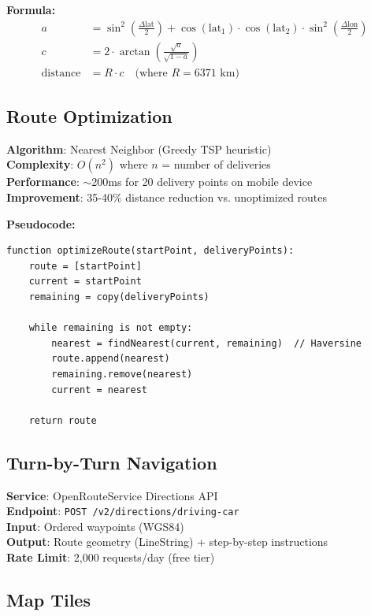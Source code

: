 \documentclass[12pt,a4paper]{article}
\begin{document}
\textbf{Formula:}
\begin{align*}
a &= \sin^2\left(\frac{\Delta\text{lat}}{2}\right) + \cos(\text{lat}_1) \cdot \cos(\text{lat}_2) \cdot \sin^2\left(\frac{\Delta\text{lon}}{2}\right) \\
c &= 2 \cdot \arctan\left(\frac{\sqrt{a}}{\sqrt{1-a}}\right) \\
\text{distance} &= R \cdot c \quad \text{(where } R = 6371 \text{ km)}
\end{align*}

\subsection{Route Optimization}

\textbf{Algorithm}: Nearest Neighbor (Greedy TSP heuristic)\\
\textbf{Complexity}: $O(n^2)$ where $n$ = number of deliveries\\
\textbf{Performance}: $\sim$200ms for 20 delivery points on mobile device\\
\textbf{Improvement}: 35-40\% distance reduction vs. unoptimized routes

\textbf{Pseudocode:}
\begin{lstlisting}[caption={Nearest Neighbor TSP Algorithm}]
function optimizeRoute(startPoint, deliveryPoints):
    route = [startPoint]
    current = startPoint
    remaining = copy(deliveryPoints)

    while remaining is not empty:
        nearest = findNearest(current, remaining)  // Haversine
        route.append(nearest)
        remaining.remove(nearest)
        current = nearest

    return route
\end{lstlisting}

\subsection{Turn-by-Turn Navigation}

\textbf{Service}: OpenRouteService Directions API\\
\textbf{Endpoint}: \texttt{POST /v2/directions/driving-car}\\
\textbf{Input}: Ordered waypoints (WGS84)\\
\textbf{Output}: Route geometry (LineString) + step-by-step instructions\\
\textbf{Rate Limit}: 2,000 requests/day (free tier)

\subsection{Map Tiles}
\end{document}
